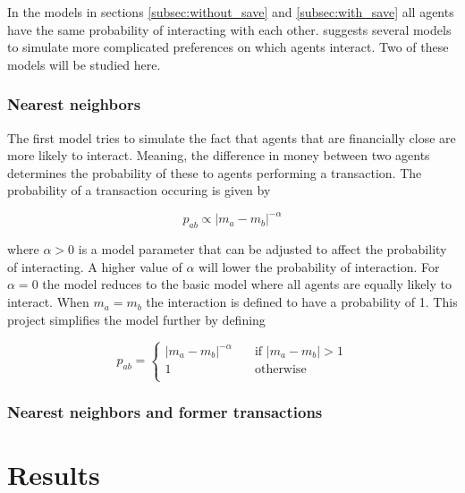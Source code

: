 \documentclass{article}
\begin{document}
In the models in sections \ref{subsec:without_save} and \ref{subsec:with_save} all agents have the same probability of interacting with each other. \cite{interaction} suggests several models to simulate more complicated preferences on which agents interact. Two of these models will be studied here. 

\subsubsection{Nearest neighbors}
\label{subsec:neighbors}

The first model tries to simulate the fact that agents that are financially close are more likely to interact. Meaning, the difference in money between two agents determines the probability of these to agents performing a transaction. The probability of a transaction occuring is given by

\begin{equation}
p_{ab} \propto |m_a - m_b|^{-\alpha}
\end{equation}

\noindent where $\alpha > 0$ is a model parameter that can be adjusted to affect the probability of interacting. A higher value of $\alpha$ will lower the probability of interaction. For $\alpha=0$ the model reduces to the basic model where all agents are equally likely to interact. When $m_a = m_b$ the interaction is defined to have a probability of 1. This project simplifies the model further by defining

\begin{equation}
p_{ab} = 
\begin{cases}
|m_a - m_b|^{-\alpha} &   \quad      \text{if } |m_a - m_b| > 1     \\
1                     &   \quad      \text{otherwise }  \\
\end{cases}
\end{equation}

\subsubsection{Nearest neighbors and former transactions}
\label{subsec:former}


\FloatBarrier
\section{Results}
\label{sec:results}

\FloatBarrier
\end{document}
